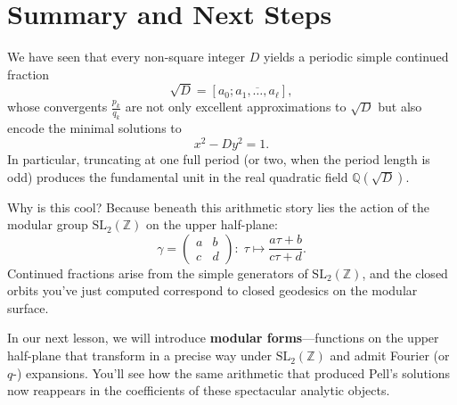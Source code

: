 \documentclass[11pt]{article}
\begin{document}
\section*{Summary and Next Steps}

We have seen that every non-square integer \(D\) yields a periodic simple continued fraction
\[
\sqrt{D}=[a_0;\overline{a_1,\dots,a_\ell}],
\]
whose convergents \(\tfrac{p_k}{q_k}\) are not only excellent approximations to \(\sqrt{D}\) but also encode the minimal solutions to
\[
x^2 - D y^2 = 1.
\]
In particular, truncating at one full period (or two, when the period length is odd) produces the fundamental unit in the real quadratic field \(\mathbb{Q}(\sqrt{D})\).

Why is this cool?  Because beneath this arithmetic story lies the action of the modular group \(\mathrm{SL}_2(\mathbb{Z})\) on the upper half-plane:
\[
\gamma=\begin{pmatrix}a&b\\c&d\end{pmatrix}:\; \tau\mapsto\frac{a\tau+b}{c\tau+d}.
\]
Continued fractions arise from the simple generators of \(\mathrm{SL}_2(\mathbb{Z})\), and the closed orbits you’ve just computed correspond to closed geodesics on the modular surface.  

In our next lesson, we will introduce \textbf{modular forms}—functions on the upper half-plane that transform in a precise way under \(\mathrm{SL}_2(\mathbb{Z})\) and admit Fourier (or \(q\)-) expansions.  You’ll see how the same arithmetic that produced Pell’s solutions now reappears in the coefficients of these spectacular analytic objects.
\end{document}
